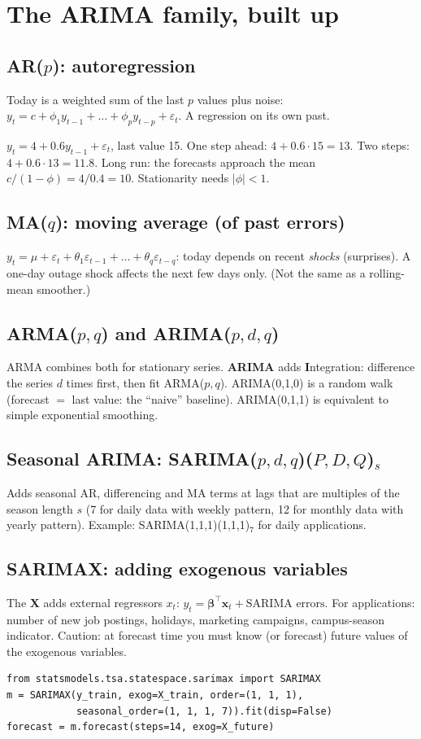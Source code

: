 \section{The ARIMA family, built up}
\subsection{AR($p$): autoregression}
Today is a weighted sum of the last $p$ values plus noise: $y_t = c + \phi_1y_{t-1} + \dots + \phi_py_{t-p} + \varepsilon_t$. A regression on its own past.
\begin{example}[: AR(1) forecast]
$y_t = 4 + 0.6y_{t-1} + \varepsilon_t$, last value 15. One step ahead: $4 + 0.6\cdot15 = 13$. Two steps: $4 + 0.6\cdot13 = 11.8$. Long run: the forecasts approach the mean
$c/(1 - \phi) = 4/0.4 = 10$. Stationarity needs $|\phi| < 1$.
\end{example}

\subsection{MA($q$): moving average (of past errors)}
$y_t = \mu + \varepsilon_t + \theta_1\varepsilon_{t-1} + \dots + \theta_q\varepsilon_{t-q}$: today depends on recent \emph{shocks} (surprises). A one-day outage shock affects the
next few days only. (Not the same as a rolling-mean smoother.)

\subsection{ARMA($p,q$) and ARIMA($p,d,q$)}
ARMA combines both for stationary series. \textbf{ARIMA} adds \textbf{I}ntegration: difference the series $d$ times first, then fit ARMA($p, q$). ARIMA(0,1,0) is a random
walk (forecast $=$ last value: the ``naive'' baseline). ARIMA(0,1,1) is equivalent to simple exponential smoothing.

\subsection{Seasonal ARIMA: SARIMA($p,d,q$)($P,D,Q$)$_s$}
Adds seasonal AR, differencing and MA terms at lags that are multiples of the season length $s$ (7 for daily data with weekly pattern, 12 for monthly data with yearly
pattern). Example: SARIMA(1,1,1)(1,1,1)$_7$ for daily applications.

\subsection{SARIMAX: adding exogenous variables}
The \textbf{X} adds external regressors $x_t$: $y_t = \boldsymbol\beta^\top\mathbf x_t + \text{SARIMA errors}$. For applications: number of new job postings, holidays,
marketing campaigns, campus-season indicator. Caution: at forecast time you must know (or forecast) future values of the exogenous variables.
\begin{lstlisting}
from statsmodels.tsa.statespace.sarimax import SARIMAX
m = SARIMAX(y_train, exog=X_train, order=(1, 1, 1),
            seasonal_order=(1, 1, 1, 7)).fit(disp=False)
forecast = m.forecast(steps=14, exog=X_future)
\end{lstlisting}

